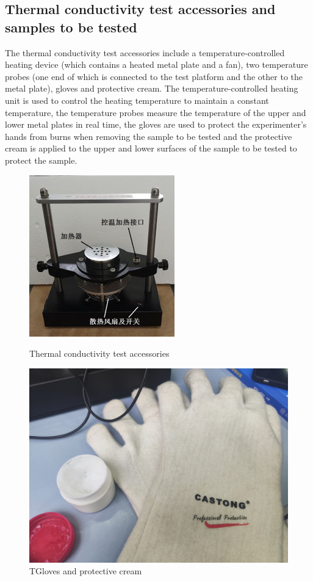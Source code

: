 \documentclass[UTF8]{article}
\begin{document}
	 

	    \subsection{Thermal conductivity test accessories and samples to be tested}
	    The thermal conductivity test accessories include a temperature-controlled heating device (which contains a heated metal plate and a fan), two temperature probes (one end of which is connected to the test platform and the other to the metal plate), gloves and protective cream. The temperature-controlled heating unit is used to control the heating temperature to maintain a constant temperature, the temperature probes measure the temperature of the upper and lower metal plates in real time, the gloves are used to protect the experimenter's hands from burns when removing the sample to be tested and the protective cream is applied to the upper and lower surfaces of the sample to be tested to protect the sample.
	    \begin{figure}[H]
	    	\begin{minipage}[t]{0.4\linewidth}
	    		\centering
	    		\includegraphics[clip,scale=0.8,trim={0 4 0 4}]{fig/fig4.jpg}
	    		\caption{ Thermal conductivity test accessories}
	    		\label{figure.4}
	    	\end{minipage}
	    	\begin{minipage}[t]{0.65\linewidth}
	    		\centering
	    		\includegraphics[clip,scale=0.07,trim={400 0 100 120}]{fig/fig5.jpg}
	    		\caption{TGloves and protective cream}
	    		\label{figure.5}
	    	\end{minipage}
	    \end{figure}
    
\end{document}
